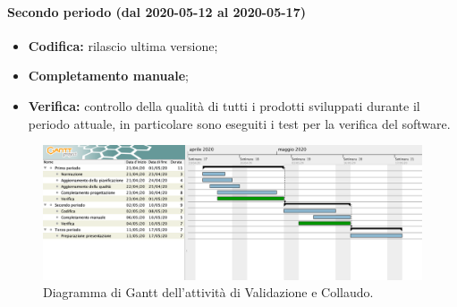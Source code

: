 				\paragraph{Secondo periodo (dal 2020-05-12 al 2020-05-17)}
				
					\begin{itemize}
						\item \textbf{Codifica:} rilascio ultima versione;
						\item \textbf{Completamento manuale};
						\item \textbf{Verifica:} controllo della qualità di tutti i prodotti sviluppati durante il periodo attuale, in particolare sono eseguiti i test per la verifica del software.
					\end{itemize}

			
		\begin{landscape}

          \begin{figure}[H]
            \centering
            \includegraphics[width=\linewidth]{images/ganttValidazioneColl}
            \caption{Diagramma di Gantt dell'attività di Validazione e Collaudo.}
          \end{figure}

		\end{landscape}
